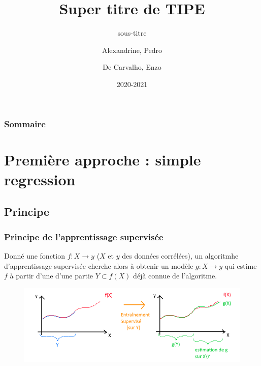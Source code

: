 \documentclass{beamer}
\title{Super titre de TIPE}
\subtitle{sous-titre}
\author{Alexandrine, Pedro\\\and De Carvalho, Enzo}
\date{2020-2021}
\begin{document}
\begin{frame}
	\maketitle
\end{frame}

\begin{frame}
	\frametitle{Sommaire}
	\tableofcontents
\end{frame}

\section{Première approche : simple regression}
\subsection{Principe}
\begin{frame}
	\frametitle{Principe de l'apprentissage supervisée}
	Donné une fonction $f : X \rightarrow y$ ($X$ et $y$ des données corrélées), un algoritmhe d'apprentissage supervisée cherche alors à obtenir un modèle $g : X \rightarrow y$ qui estime $f$ à partir d'une d'une partie $Y \subset f(X)$ déjà connue de l'algoritme.
	\begin{figure}[b]
		\centering
		\includegraphics[scale=0.65]{super_schema}
	\end{figure}
\end{frame}
		
\end{document}
